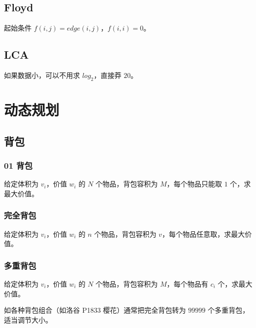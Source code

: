 \documentclass[cn,11pt,black,normal,founder]{elegantbook}
\begin{document}


\section{Floyd}

起始条件 $f(i,j)=edge(i,j)$，$f(i,i)=0$。



\section{LCA}

如果数据小，可以不用求 $log_2$，直接莽 $20$。




\chapter{动态规划}

\section{背包}

\subsection{01 背包}

给定体积为 $v_i$，价值 $w_i$ 的 $N$ 个物品，背包容积为 $M$，每个物品只能取 $1$ 个，求最大价值。



\subsection{完全背包}

给定体积为 $v_i$，价值 $w_i$ 的 $n$ 个物品，背包容积为 $v$，每个物品任意取，求最大价值。



\subsection{多重背包}

给定体积为 $v_i$，价值 $w_i$ 的 $N$ 个物品，背包容积为 $M$，每个物品有 $c_i$ 个，求最大价值。

如各种背包组合（如洛谷 P1833 樱花）通常把完全背包转为 $99999$ 个多重背包，适当调节大小。


\end{document}
